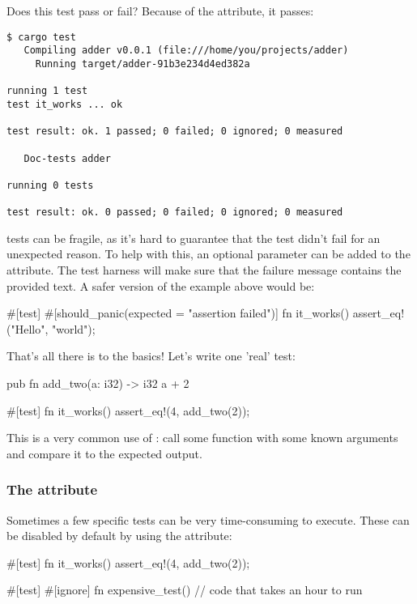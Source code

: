 Does this test pass or fail? Because of the  attribute, it passes:

\begin{verbatim}
$ cargo test
   Compiling adder v0.0.1 (file:///home/you/projects/adder)
     Running target/adder-91b3e234d4ed382a

running 1 test
test it_works ... ok

test result: ok. 1 passed; 0 failed; 0 ignored; 0 measured

   Doc-tests adder

running 0 tests

test result: ok. 0 passed; 0 failed; 0 ignored; 0 measured
\end{verbatim}

 tests can be fragile, as it's hard to guarantee that the test didn't fail for an unexpected reason. To help 
with this, an optional  parameter can be added to the  attribute. The test harness will make 
sure that the failure message contains the provided text. A safer version of the example above would be:

\begin{rustc}
#[test]
#[should_panic(expected = "assertion failed")]
fn it_works() {
    assert_eq!("Hello", "world");
}
\end{rustc}

That's all there is to the basics! Let's write one 'real' test:

\begin{rustc}
pub fn add_two(a: i32) -> i32 {
    a + 2
}

#[test]
fn it_works() {
    assert_eq!(4, add_two(2));
}
\end{rustc}

This is a very common use of : call some function with some known arguments and compare it to the expected output.

\subsubsection*{The  attribute}

Sometimes a few specific tests can be very time-consuming to execute. These can be disabled by default by using the  attribute:

\begin{rustc}
#[test]
fn it_works() {
    assert_eq!(4, add_two(2));
}

#[test]
#[ignore]
fn expensive_test() {
    // code that takes an hour to run
}
\end{rustc}

